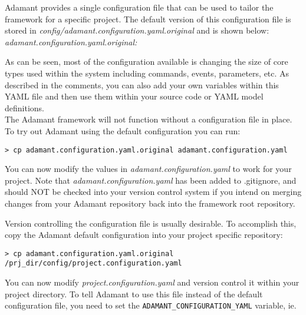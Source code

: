 Adamant provides a single configuration file that can be used to tailor the framework for a specific project. The default version of this configuration file is stored in \textit{config/adamant.configuration.yaml.original} and is shown below: \\

\textit{adamant.configuration.yaml.original:}

As can be seen, most of the configuration available is changing the size of core types used within the system including commands, events, parameters, etc. As described in the comments, you can also add your own variables within this YAML file and then use them within your source code or YAML model definitions. \\

The Adamant framework will not function without a configuration file in place. To try out Adamant using the default configuration you can run:

\vspace{5mm} %
\begin{verbatim}
> cp adamant.configuration.yaml.original adamant.configuration.yaml
\end{verbatim}
\vspace{5mm} %

You can now modify the values in \textit{adamant.configuration.yaml} to work for your project. Note that \textit{adamant.configuration.yaml} has been added to .gitignore, and should NOT be checked into your version control system if you intend on merging changes from your Adamant repository back into the framework root repository.

Version controlling the configuration file is usually desirable. To accomplish this, copy the Adamant default configuration into your project specific repository:

\vspace{5mm} %
\begin{verbatim}
> cp adamant.configuration.yaml.original /prj_dir/config/project.configuration.yaml
\end{verbatim}
\vspace{5mm} %

You can now modify \textit{project.configuration.yaml} and version control it within your project directory. To tell Adamant to use this file instead of the default configuration file, you need to set the \texttt{ADAMANT\_CONFIGURATION\_YAML} variable, ie.

